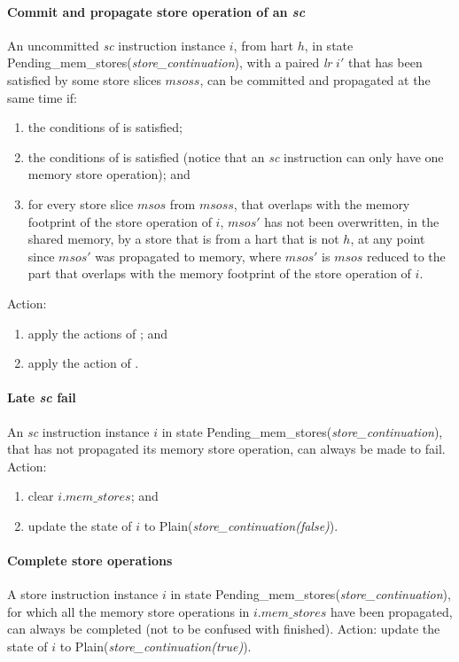 \paragraph{Commit and propagate store operation of an {\em sc}}\label{omm:commit_sc}
An uncommitted {\em sc} instruction instance $i$, from hart $h$, in state {\sc Pending\_mem\_stores}({\it store\_continuation}), with a paired {\em lr} $i'$ that has been satisfied by some store slices $msoss$, can be committed and propagated at the same time if:
\begin{enumerate}
\item the conditions of  is satisfied;
\item the conditions of  is satisfied (notice that an {\em sc} instruction can only have one memory store operation); and
\item for every store slice $msos$ from $msoss$, that overlaps with the memory footprint of the store operation of $i$, $msos'$ has not been overwritten, in the shared memory, by a store that is from a hart that is not $h$, at any point since $msos'$ was propagated to memory, where $msos'$ is $msos$ reduced to the part that overlaps with the memory footprint of the store operation of $i$.
\end{enumerate}
Action:
\begin{enumerate}
\item apply the actions of ; and
\item apply the action of .
\end{enumerate}


\paragraph{Late {\em sc} fail}\label{omm:late_sc_fail}
An {\em sc} instruction instance $i$ in state {\sc Pending\_mem\_stores}({\it store\_continuation}), that has not propagated its memory store operation, can always be made to fail.
Action:
\begin{enumerate}
\item clear $i.\textit{mem\_stores}$; and
\item update the state of $i$ to {\sc Plain}({\it store\_continuation(false)}).
\end{enumerate}


\paragraph{Complete store operations}\label{omm:complete_stores}
A store instruction instance $i$ in state {\sc Pending\_mem\_stores}({\it store\_continuation}), for which all the memory store operations in $i.\textit{mem\_stores}$ have been propagated, can always be completed (not to be confused with finished).
Action: update the state of $i$ to {\sc Plain}({\it store\_continuation(true)}).



